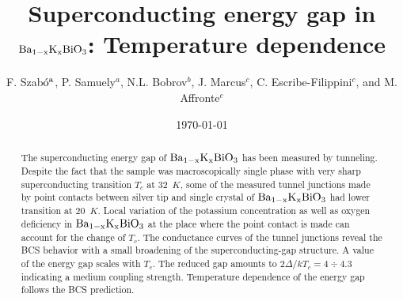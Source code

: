 \documentclass[twocolumn,amsmath,floats,showpacs,nofootinbib]{revtex4}
\begin{document}
\title{Superconducting energy gap in $\rm Ba_{1-x}K_xBiO_3$: Temperature dependence}

\author{F. Szab$\rm \acute{o}^a$, P. Samuely$^a$, N.L. Bobrov$^b$, J. Marcus$^c$, C. Escribe-Filippini$^c$, and M. Affronte$^c$}


\date{\today}

\begin{abstract}The superconducting energy gap of $\rm Ba_{1-x}K_xBiO_3$ has been measured by tunneling. Despite the fact that the sample was macroscopically single phase with very sharp superconducting transition $T_c$ at 32~$K$, some of the measured tunnel junctions made by point contacts between silver tip and single crystal of $\rm Ba_{1-x}K_xBiO_3$ had lower transition at 20~$K$. Local variation of the potassium concentration as well as oxygen deficiency in $\rm Ba_{1-x}K_xBiO_3$ at the place where the point contact is made can account for the change of $T_c$. The conductance curves of the tunnel junctions reveal the BCS behavior with a small broadening of the superconducting-gap structure. A value of the energy gap scales with $T_c$. The reduced gap amounts to $2\Delta/kT_c = 4\div 4.3$ indicating a medium coupling strength. Temperature dependence of the energy gap follows the BCS prediction.
\end{abstract}

\maketitle
\end{document}
